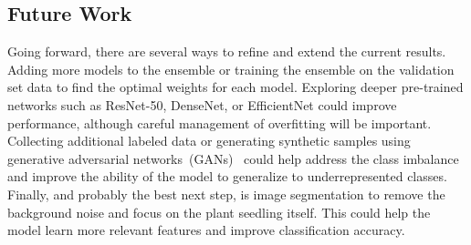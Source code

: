 \subsection{Future Work}

Going forward, there are several ways to refine and extend the current results. Adding more models to the ensemble or training the ensemble on the validation set data to find the optimal weights for each model. Exploring deeper pre-trained networks such as ResNet-50, DenseNet, or EfficientNet could improve performance, although careful management of overfitting will be important. Collecting additional labeled data or generating synthetic samples using generative adversarial networks~(GANs)~\cite{goodfellow2014generativeadversarialnetworks} could help address the class imbalance and improve the ability of the model to generalize to underrepresented classes. Finally, and probably the best next step, is image segmentation to remove the background noise and focus on the plant seedling itself. This could help the model learn more relevant features and improve classification accuracy.